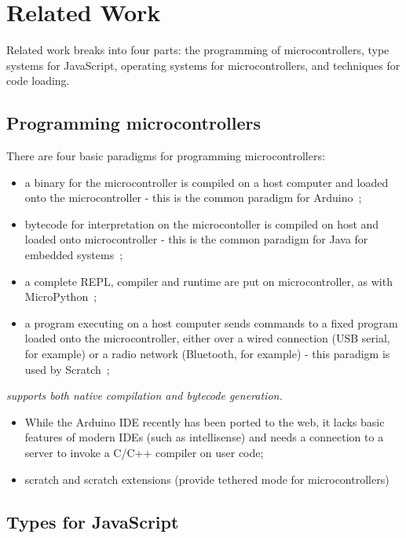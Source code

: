 \section{Related Work}
\label{sec:related}

Related work breaks into four parts: the programming of microcontrollers, 
type systems for JavaScript, operating systems
for microcontrollers, and techniques for code loading.

\subsection{Programming microcontrollers}

There are four basic paradigms for programming microcontrollers:
\begin{itemize}
\item a binary for the microcontroller is compiled on a host computer and loaded onto the microcontroller -
this is the common paradigm for Arduino~\cite{buildingArduino2014};
\item bytecode for interpretation on the microcontoller is compiled on host and loaded onto microcontroller - 
this is the common paradigm for Java for embedded systems~\cite{ClausenTOPLAS};
\item a complete REPL, compiler and runtime are put on microcontroller, as 
with MicroPython~\cite{MicroPython};
\item a program executing on a host computer sends commands to a fixed program loaded onto the
microcontroller, either over a wired connection (USB serial, for example) or a radio network
(Bluetooth, for example) - this paradigm is used by Scratch~\cite{ScratchCACM2009};
\end{itemize}

\emph{\MC supports both native compilation and bytecode generation.}

\begin{itemize}
\item While the Arduino IDE recently 
has been ported to the web, it lacks basic features of modern IDEs (such as intellisense) 
and needs a connection to a server to invoke a C/C++ compiler on user code;
\item scratch and scratch extensions (provide tethered mode for microcontrollers)
\end{itemize}

\subsection{Types for JavaScript}

